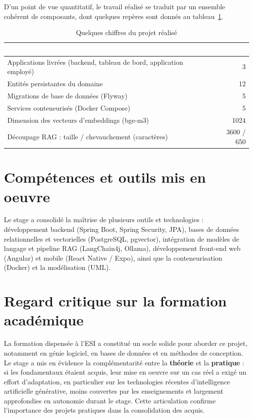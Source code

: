 \documentclass[a4paper,12pt,oneside]{report}
\newcommand{\thd}[1]{\textcolor{white}{\textbf{#1}}}
\begin{document}
D'un point de vue quantitatif, le travail réalisé se traduit par un ensemble
cohérent de composants, dont quelques repères sont donnés au
tableau~\ref{tab:chiffres}.

\begin{table}[H]
\centering
\begin{tabularx}{\linewidth}{X r}
\toprule
\rowcolor{gHead}\thd{Élément} & \thd{Nombre} \\
\midrule
Applications livrées (backend, tableau de bord, application employé) & 3 \\
\rowcolor{gBand}
Entités persistantes du domaine & 12 \\
Migrations de base de données (Flyway) & 5 \\
\rowcolor{gBand}
Services conteneurisés (Docker Compose) & 5 \\
Dimension des vecteurs d'embeddings (bge-m3) & 1024 \\
\rowcolor{gBand}
Découpage RAG : taille / chevauchement (caractères) & 3600 / 650 \\
\bottomrule
\end{tabularx}
\caption{Quelques chiffres du projet réalisé}
\label{tab:chiffres}
\end{table}

\section{Compétences et outils mis en oeuvre}
Le stage a consolidé la maîtrise de plusieurs outils et technologies :
développement backend (Spring Boot, Spring Security, JPA), bases de données
relationnelles et vectorielles (PostgreSQL, pgvector), intégration de modèles de
langage et pipeline RAG (LangChain4j, Ollama), développement front-end web
(Angular) et mobile (React Native / Expo), ainsi que la conteneurisation
(Docker) et la modélisation (UML).

\section{Regard critique sur la formation académique}
La formation dispensée à l'ESI a constitué un socle solide pour aborder ce
projet, notamment en génie logiciel, en bases de données et en méthodes de
conception. Le stage a mis en évidence la complémentarité entre la
\textbf{théorie} et la \textbf{pratique} : si les fondamentaux étaient acquis,
leur mise en oeuvre sur un cas réel a exigé un effort d'adaptation, en
particulier sur les technologies récentes d'intelligence artificielle
générative, moins couvertes par les enseignements et largement approfondies en
autonomie durant le stage. Cette articulation confirme l'importance des projets
pratiques dans la consolidation des acquis.
\end{document}
